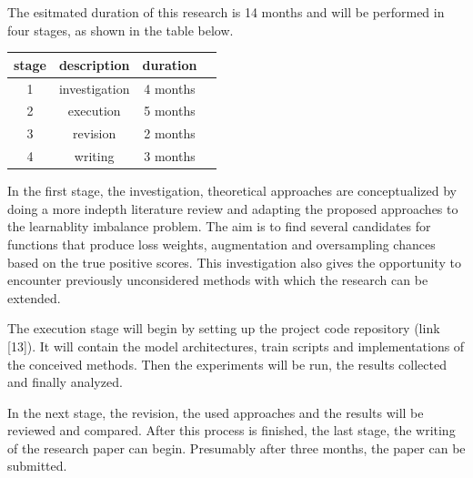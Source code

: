 \documentclass[journal]{IEEEtran}
\begin{document}
The esitmated duration of this research is 14 months and will be performed in four stages, as shown in the table below.

\begin{center}

        \begin{tabular}{ |c|c|c|c| } 
                \hline
                stage & description & duration \\
                \hline
                1 & investigation & 4 months \\ 
                2 & execution & 5 months \\ 
                3 & revision & 2 months \\ 
                4 & writing & 3 months \\
                \hline

        \end{tabular}
\end{center}
        
In the first stage, the investigation, theoretical approaches are conceptualized by doing a more indepth literature review and adapting the proposed approaches to the learnablity imbalance problem. 
The aim is to find several candidates for functions that produce loss weights, augmentation and oversampling chances based on the true positive scores.
This investigation also gives the opportunity to encounter previously unconsidered methods with which the research can be extended.

The execution stage will begin by setting up the project code repository (link [13]). 
It will contain the model architectures, train scripts and implementations of the conceived methods.
Then the experiments will be run, the results collected and finally analyzed. 

In the next stage, the revision, the used approaches and the results will be reviewed and compared. 
After this process is finished, the last stage, the writing of the research paper can begin. 
Presumably after three months, the paper can be submitted.  


\printbibliography
\end{document}
